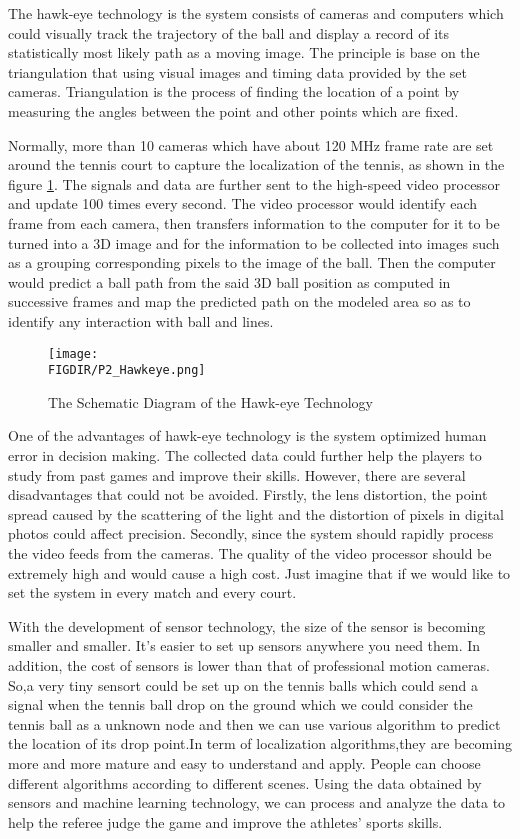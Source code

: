 The hawk-eye technology\cite{baodong2014hawkeye} \cite{gangal2007hawkeye} is the system consists of cameras and computers which could visually track the trajectory of the ball and display a record of its statistically most likely path as a moving image.  The principle\cite{chao2016tennis} is base on the triangulation that using visual images and timing data provided by the set cameras. Triangulation is the process of finding the location of a point by measuring the angles between the point and other points which are fixed.

Normally, more than 10 cameras \cite{lai2007study} which have about 120 MHz frame rate are set around the tennis court to capture the localization of the tennis, as shown in the figure \ref{Hawk-eye}. The signals and data are further sent to the high-speed video processor and update 100 times every second. The video processor would identify each frame from each camera, then transfers information to the computer for it to be turned into a 3D image and for the information to be collected into images such as a grouping corresponding pixels to the image of the ball. Then the computer would predict a ball path from the said 3D ball position as computed in successive frames and map the predicted path on the modeled area so as to identify any interaction with ball and lines.

\begin{figure}[ht]
\centering
\texttt{[image: \\FIGDIR/P2\_Hawkeye.png]}
\caption{The Schematic Diagram of the Hawk-eye Technology}
\label{Hawk-eye}
\end{figure}

One of the advantages of hawk-eye technology is the system optimized human error in decision making. The collected data could further help the players to study from past games and improve their skills. However, there are several disadvantages that could not be avoided. Firstly, the lens distortion, the point spread caused by the scattering of the light and the distortion of pixels in digital photos could affect precision. Secondly, since the system should rapidly process the video feeds from the cameras. The quality of the video processor should be extremely high and would cause a high cost. Just imagine that if we would like to set the system in every match and every court.

With the development of sensor technology, the size of the sensor is becoming smaller and smaller. It's easier to set up sensors anywhere you need them. In addition, the cost of sensors is lower than that of professional motion cameras. So,a very tiny sensort could be set up on the tennis balls which could send a signal when the tennis ball drop on the ground which we could consider the tennis ball as a unknown node and then we can use various algorithm to predict the location of its drop point.In term of localization algorithms,they are becoming more and more mature and easy to understand and apply. People can choose different algorithms according to different scenes. Using the data obtained by sensors and machine learning technology, we can process and analyze the data to help the referee judge the game and improve the athletes' sports skills.\\
